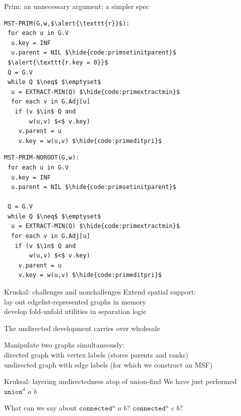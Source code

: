 \documentclass[usenames, xcolor=dvipsnames]{beamer}
\newcommand{\hide}[1]{}
\newcommand{\m}[1]{\ensuremath{\mathit{#1}}} %
\begin{document}
\begin{frame}[fragile]{Prim: an unnecessary argument; a simpler spec}

\begin{minipage}{0.48\textwidth}
\begin{lstlisting}
MST-PRIM(G,w,$\alert{\texttt{r}}$):
 for each u in G.V
  u.key = INF
  u.parent = NIL $\hide{code:primsetinitparent}$
 $\alert{\texttt{r.key = 0}}$
 Q = G.V
 while Q $\neq$ $\emptyset$
  u = EXTRACT-MIN(Q) $\hide{code:primextractmin}$
  for each v in G.Adj[u]
   if (v $\in$ Q and 
       w(u,v) $<$ v.key)
    v.parent = u
    v.key = w(u,v) $\hide{code:primeditpri}$
\end{lstlisting} \end{minipage}
\begin{minipage}{0.5\textwidth}
\begin{lstlisting}
MST-PRIM-NOROOT(G,w):
 for each u in G.V
  u.key = INF
  u.parent = NIL $\hide{code:primsetinitparent}$

 Q = G.V
 while Q $\neq$ $\emptyset$
  u = EXTRACT-MIN(Q) $\hide{code:primextractmin}$
  for each v in G.Adj[u]
   if (v $\in$ Q and 
       w(u,v) $<$ v.key)
    v.parent = u
    v.key = w(u,v) $\hide{code:primeditpri}$
\end{lstlisting} 
\end{minipage} 
\end{frame}


\begin{frame}{Kruskal: challenges and nonchallenges}
Extend spatial support: \\
\hspace{1em} lay out edgelist-represented graphs in memory \\
\hspace{1em} develop fold-unfold utilities in separation logic

\bigskip

The undirected development carries over wholesale

\bigskip

Manipulate two graphs simultaneously: \\
\hspace{1em}directed graph with vertex labels (stores parents and ranks) \\
\hspace{1em}undirected graph with edge labels (for which we construct an MSF)
\end{frame}

\begin{frame}{Kruksal: layering undirectedness atop of union-find}
  We have just performed $\texttt{union}^{d}$ \m{a} \m{b} \\
  \vspace{2em}
  {\centering
  
  
  }
 \pause \bigskip
  What can we say about $\texttt{connected}^{u}$ \m{a} \m{b}? $\texttt{connected}^{u}$ \m{c} \m{b}?
\end{frame}
\end{document}

